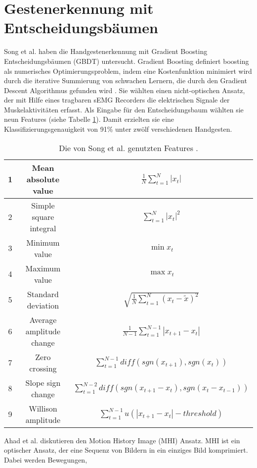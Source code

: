 \section{Gestenerkennung mit Entscheidungsbäumen}
\label{sec:sota_misc}
Song et al. \cite{song2019design} haben die Handgestenerkennung mit Gradient Boosting Entscheidungsbäumen (GBDT) untersucht. Gradient Boosting definiert boosting als numerisches Optimierungsproblem,
indem eine Kostenfunktion minimiert wird durch die iterative Summierung von schwachen Lernern, die durch den Gradient Descent Algorithmus gefunden wird \cite{friedman1999greedy}. Sie wählten einen nicht-optischen
Ansatz, der mit Hilfe eines tragbaren sEMG Recorders die elektrischen Signale der Muskelaktivitäten erfasst. Als Eingabe für den Entscheidungsbaum wählten sie neun Features (siehe Tabelle \ref{tab:songFeatures}).
Damit erzielten sie eine Klassifizierungsgenauigkeit von 91\% unter zwölf verschiedenen Handgesten.
\begin{table}[h!]
    \centering
    \begin{tabular}{ c | c | c }
        \hline
        \hline
        1 & Mean absolute value & $\frac{1}{N}\sum^N_{t=1} |x_t|$ \\\hline
        2 & Simple square integral & $\sum^N_{t=1} |x_t|^2$ \\\hline
        3 & Minimum value & $\min x_t$ \\\hline
        4 & Maximum value & $\max x_t$ \\\hline
        5 & Standard deviation & $\sqrt{\frac{1}{N}\sum^N_{t=1}(x_t - \tilde{x})^2}$ \\\hline
        6 & Average amplitude change & $\frac{1}{N-1}\sum^{N-1}_{t=1} |x_{t + 1} - x_t|$ \\\hline
        7 & Zero crossing & $\sum^{N-1}_{t=1}diff(sgn(x_{t+1}),sgn(x_t))$ \\\hline
        8 & Slope sign change & $\sum^{N-2}_{t=1}diff(sgn(x_{t+1} - x_t),sgn(x_t - x_{t - 1}))$ \\\hline
        9 & Willison amplitude & $\sum^{N-1}_{t=1}u(|x_{t+1} - x_t| - threshold)$ \\
        \hline
        \hline
    \end{tabular}
    \caption{Die von Song et al. genutzten Features \cite{song2019design}.}
    \label{tab:songFeatures}
\end{table}
\newline
\newline
Ahad et al. \cite{ahad2012motion} diskutieren den Motion History Image (MHI) Ansatz. MHI ist ein optischer Ansatz, der eine Sequenz von Bildern in ein einziges Bild komprimiert. Dabei werden Bewegungen,
